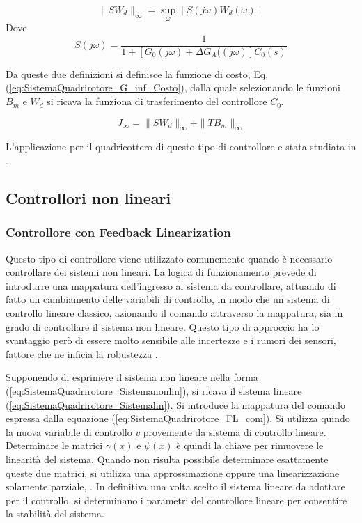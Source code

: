 \begin{equation}\label{eq:SistemaQuadrirotore_G_inf_maximaS}
	\|S W_d\|_\infty = \sup_\omega \mid S(j \omega) W_d(\omega) \mid
\end{equation}
Dove 
\[ 
	S(j \omega) = \frac{1}{1+ \left[G_0(j \omega) + \Delta G_A((j \omega) \right]C_0(s)}
\]

Da queste due definizioni si definisce la funzione di costo, Eq. (\ref{eq:SistemaQuadrirotore_G_inf_Costo}), dalla quale selezionando le funzioni $B_m$ e $W_d$ si ricava la funziona di trasferimento del controllore $C_0$.

\begin{equation}\label{eq:SistemaQuadrirotore_G_inf_Costo}
	J_\infty = \| S W_d \|_\infty + \| T B_m\|_\infty
\end{equation}

L'applicazione per il quadricottero di questo tipo di controllore e stata studiata in \cite{G_inf}.

\subsection{Controllori non lineari}

\subsubsection{Controllore con Feedback Linearization}

Questo tipo di controllore viene utilizzato comunemente quando è necessario controllare dei sistemi non lineari. La logica di funzionamento prevede di introdurre una mappatura dell'ingresso al sistema da controllare, attuando di fatto un cambiamento delle variabili di controllo, in modo che un sistema di controllo lineare classico, azionando il comando attraverso la mappatura, sia in grado di controllare il sistema non lineare.  Questo tipo di approccio ha lo svantaggio però di essere molto sensibile alle incertezze e i rumori dei sensori, fattore che ne inficia la robustezza \cite{KimJinho2020ACSo}.

Supponendo di esprimere il sistema non lineare nella forma (\ref{eq:SistemaQuadrirotore_Sistemanonlin}), si ricava il sistema lineare (\ref{eq:SistemaQuadrirotore_Sistemalin}). Si introduce la mappatura del comando espressa dalla equazione (\ref{eq:SistemaQuadrirotore_FL_com}). Si utilizza quindo la nuova variabile di controllo $v$ proveniente da sistema di controllo lineare. Determinare le matrici $\gamma(x)$ e $\psi(x)$ è quindi la chiave per rimuovere le linearità del sistema. Quando non risulta possibile determinare esattamente queste due matrici, si utilizza una approssimazione oppure una linearizzazione solamente parziale, \cite{Feedlin}. In definitiva una volta scelto il sistema lineare da adottare per il controllo, si determinano i parametri del controllore lineare per consentire la stabilità del sistema.

